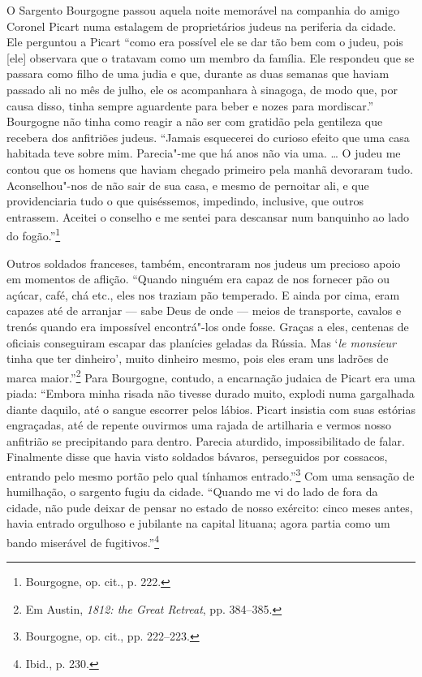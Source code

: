 %

O Sargento Bourgogne passou aquela noite memorável na companhia do amigo
Coronel Picart numa estalagem de proprietários judeus na periferia da
cidade. Ele perguntou a Picart ``como era possível ele se dar tão bem
com o judeu, pois {[}ele{]} observara que o tratavam como um membro da
família. Ele respondeu que se passara como filho de uma judia e que,
durante as duas semanas que haviam passado ali no mês de julho, ele os
acompanhara à sinagoga, de modo que, por causa disso, tinha sempre
aguardente para beber e nozes para mordiscar.'' Bourgogne não tinha como
reagir a não ser com gratidão pela gentileza que recebera dos anfitriões
judeus. ``Jamais esquecerei do curioso efeito que uma casa habitada teve
sobre mim. Parecia"-me que há anos não via uma. \ldots{} O judeu me
contou que os homens que haviam chegado primeiro pela manhã devoraram
tudo. Aconselhou"-nos de não sair de sua casa, e mesmo de pernoitar ali,
e que providenciaria tudo o que quiséssemos, impedindo, inclusive, que
outros entrassem. Aceitei o conselho e me sentei para descansar num
banquinho ao lado do fogão.''\footnote{Bourgogne, op. cit., p. 222.}

Outros soldados franceses, também, encontraram nos judeus um precioso
apoio em momentos de aflição. ``Quando ninguém era capaz de nos fornecer
pão ou açúcar, café, chá etc., eles nos traziam pão temperado. E ainda
por cima, eram capazes até de arranjar --- sabe Deus de onde --- meios de
transporte, cavalos e trenós quando era impossível encontrá"-los onde
fosse. Graças a eles, centenas de oficiais conseguiram escapar das
planícies geladas da Rússia. Mas `\textit{le monsieur} tinha que ter
dinheiro', muito dinheiro mesmo, pois eles eram uns ladrões de marca
maior.''\footnote{Em Austin, \textit{1812: the Great Retreat}, pp. 384--385.} Para Bourgogne, contudo, a encarnação judaica de Picart era uma piada: ``Embora minha risada não tivesse durado muito, explodi numa
gargalhada diante daquilo, até o sangue escorrer pelos lábios. Picart
insistia com suas estórias engraçadas, até de repente ouvirmos uma
rajada de artilharia e vermos nosso anfitrião se precipitando para
dentro. Parecia aturdido, impossibilitado de falar. Finalmente disse que
havia visto soldados bávaros, perseguidos por cossacos, entrando pelo
mesmo portão pelo qual tínhamos entrado.''\footnote{Bourgogne, op. cit., pp. 222--223.} Com uma sensação de humilhação, o sargento fugiu da cidade. ``Quando me vi do lado de fora da cidade, não pude deixar de
pensar no estado de nosso exército: cinco meses antes, havia entrado
orgulhoso e jubilante na capital lituana; agora partia como um bando
miserável de fugitivos.''\footnote{Ibid., p. 230.}

